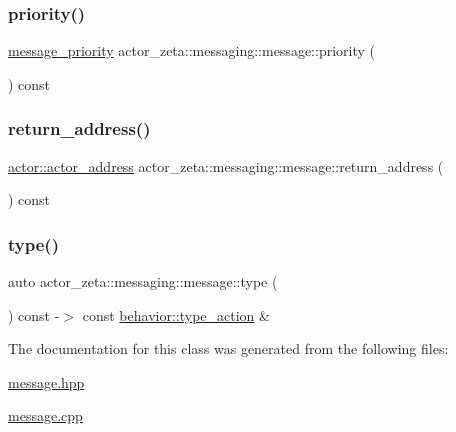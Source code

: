 \mbox{\label{classactor__zeta_1_1messaging_1_1message_af5f7ce0e94bfae703f84c358cefe80d5}} 
\subsubsection{\texorpdfstring{priority()}{priority()}}
{\footnotesize\ttfamily \hyperlink{namespaceactor__zeta_1_1messaging_a1b4c4b3ab625eb033c15da4fbe9c4a89}{message\+\_\+priority} actor\+\_\+zeta\+::messaging\+::message\+::priority (\begin{DoxyParamCaption}{ }\end{DoxyParamCaption}) const}

\mbox{\label{classactor__zeta_1_1messaging_1_1message_af1a8a856212d754964b9ef80d6f70e9e}} 
\subsubsection{\texorpdfstring{return\+\_\+address()}{return\_address()}}
{\footnotesize\ttfamily \hyperlink{classactor__zeta_1_1actor_1_1actor__address}{actor\+::actor\+\_\+address} actor\+\_\+zeta\+::messaging\+::message\+::return\+\_\+address (\begin{DoxyParamCaption}{ }\end{DoxyParamCaption}) const}

\mbox{\label{classactor__zeta_1_1messaging_1_1message_a5d44fe019c0e2451ed0add86e7403226}} 
\subsubsection{\texorpdfstring{type()}{type()}}
{\footnotesize\ttfamily auto actor\+\_\+zeta\+::messaging\+::message\+::type (\begin{DoxyParamCaption}{ }\end{DoxyParamCaption}) const -\/$>$ const \hyperlink{classactor__zeta_1_1behavior_1_1type__action}{behavior\+::type\+\_\+action} \&\hspace{0.3cm}{\ttfamily [noexcept]}}



The documentation for this class was generated from the following files\+:\begin{DoxyCompactItemize}
\item 
\hyperlink{message_8hpp}{message.\+hpp}\item 
\hyperlink{message_8cpp}{message.\+cpp}\end{DoxyCompactItemize}
